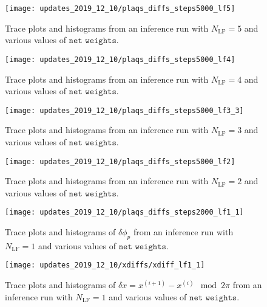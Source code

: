 %
\begin{figure}
  \centering
  \texttt{[image: updates\_2019\_12\_10/plaqs\_diffs\_steps5000\_lf5]}%
  \caption{Trace plots and histograms from an inference run with
  $N_{\mathrm{LF}} = 5$ and various values of $\texttt{net weights}$.}%
  \label{fig:trace_hist_lf5}
\end{figure}
%
\begin{figure}
  \centering
  \texttt{[image: updates\_2019\_12\_10/plaqs\_diffs\_steps5000\_lf4]}%
  \caption{Trace plots and histograms from an inference run with
  $N_{\mathrm{LF}} = 4$ and various values of $\texttt{net weights}$.}%
  \label{fig:trace_hist_lf4}
\end{figure}
%
\begin{figure}
  \centering
  \texttt{[image: updates\_2019\_12\_10/plaqs\_diffs\_steps5000\_lf3\_3]}%
  \caption{Trace plots and histograms from an inference run with
  $N_{\mathrm{LF}} = 3$ and various values of $\texttt{net weights}$.}
\end{figure}
%
\begin{figure}
  \centering
  \texttt{[image: updates\_2019\_12\_10/plaqs\_diffs\_steps5000\_lf2]}%
  \caption{Trace plots and histograms from an inference run with
  $N_{\mathrm{LF}} = 2$ and various values of $\texttt{net weights}$.}
\end{figure}
%
\begin{figure}
  \centering
  \texttt{[image: updates\_2019\_12\_10/plaqs\_diffs\_steps2000\_lf1\_1]}%
  \caption{Trace plots and histograms of $\delta \phi_{p}$ from an inference
  run with $N_{\mathrm{LF}} = 1$ and various values of $\texttt{net weights}$.}
\end{figure}
%
\begin{figure}
  \centering
  \texttt{[image: updates\_2019\_12\_10/xdiffs/xdiff\_lf1\_1]}%
  \caption{Trace plots and histograms of $\delta x = x^{(i+1)} -
    x^{(i)} \mod{2\pi} $ from an inference run with $N_{\mathrm{LF}} = 1$ and various
    values of $\texttt{net weights}$.}
\end{figure}

\clearpage%
